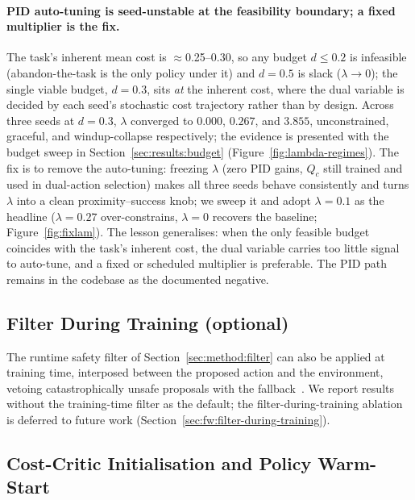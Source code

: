 \documentclass[11pt,a4paper]{report}
\begin{document}
\paragraph{PID auto-tuning is seed-unstable at the feasibility
boundary; a fixed multiplier is the fix.}
The task's inherent mean cost is $\approx$0.25--0.30, so any budget
$d \le 0.2$ is infeasible (abandon-the-task is the only policy under
it) and $d = 0.5$ is slack ($\lambda \to 0$); the single viable
budget, $d = 0.3$, sits \emph{at} the inherent cost, where the dual
variable is decided by each seed's stochastic cost trajectory rather
than by design. Across three seeds at $d = 0.3$, $\lambda$ converged
to $0.000$, $0.267$, and $3.855$, unconstrained, graceful, and
windup-collapse respectively; the evidence is presented with the
budget sweep in Section~\ref{sec:results:budget}
(Figure~\ref{fig:lambda-regimes}). The fix is to remove the
auto-tuning: freezing $\lambda$ (zero PID gains, $Q_c$ still trained
and used in dual-action selection) makes all three seeds behave
consistently and turns $\lambda$ into a clean proximity--success
knob; we sweep it and adopt $\lambda = 0.1$ as the headline
($\lambda = 0.27$ over-constrains, $\lambda = 0$ recovers the
baseline; Figure~\ref{fig:fixlam}). The lesson generalises: when the
only feasible budget coincides with the task's inherent cost, the
dual variable carries too little signal to auto-tune, and a fixed or
scheduled multiplier is preferable. The PID path remains in the
codebase as the documented negative.

\subsection{Filter During Training (optional)}
\label{sec:method:lagrangian:filter-train}

The runtime safety filter of Section~\ref{sec:method:filter} can
also be applied at training time, interposed between the proposed
action and the environment, vetoing catastrophically unsafe
proposals with the fallback~\cite{cbfrl2024,shield2025}. We report
results without the training-time filter as the default; the
filter-during-training ablation is deferred to future work
(Section~\ref{sec:fw:filter-during-training}).

\subsection{Cost-Critic Initialisation and Policy Warm-Start}
\label{sec:method:lagrangian:warmstart}
\end{document}
